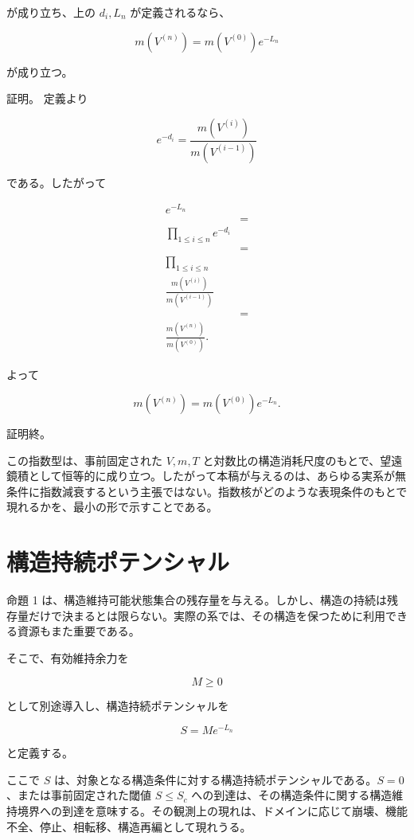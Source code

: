 \documentclass[12pt,a4paper]{article}
\begin{document}
が成り立ち、上の \(d_{i},L_{n}\) が定義されるなら、

\[
m(V^{(n)}) = m(V^{(0)}) e^{-L_{n}}
\]

が成り立つ。

証明。 定義より

\[
e^{-d_{i}}=\frac{m(V^{(i)})}{m(V^{(i-1)})}
\]

である。したがって

\[
\begin{aligned}
e^{-L_{n}} \\
&= \\
\prod_{1\le i\le n} e^{-d_{i}} \\
&= \\
\prod_{1\le i\le n} \\
\frac{m(V^{(i)})}{m(V^{(i-1)})} \\
&= \\
\frac{m(V^{(n)})}{m(V^{(0)})}.
\end{aligned}
\]

よって

\[
m(V^{(n)}) = m(V^{(0)})e^{-L_{n}}.
\]

証明終。

この指数型は、事前固定された \(V,m,T\) と対数比の構造消耗尺度のもとで、望遠鏡積として恒等的に成り立つ。したがって本稿が与えるのは、あらゆる実系が無条件に指数減衰するという主張ではない。指数核がどのような表現条件のもとで現れるかを、最小の形で示すことである。

\section{構造持続ポテンシャル}\label{ux69cbux9020ux6301ux7d9aux30ddux30c6ux30f3ux30b7ux30e3ux30eb}

命題 1 は、構造維持可能状態集合の残存量を与える。しかし、構造の持続は残存量だけで決まるとは限らない。実際の系では、その構造を保つために利用できる資源もまた重要である。

そこで、有効維持余力を

\[
M\ge 0
\]

として別途導入し、構造持続ポテンシャルを

\[
S = M e^{-L_{n}}
\]

と定義する。

ここで \(S\) は、対象となる構造条件に対する構造持続ポテンシャルである。\(S=0\)、または事前固定された閾値 \(S\le S_{c}\) への到達は、その構造条件に関する構造維持境界への到達を意味する。その観測上の現れは、ドメインに応じて崩壊、機能不全、停止、相転移、構造再編として現れうる。
\end{document}
